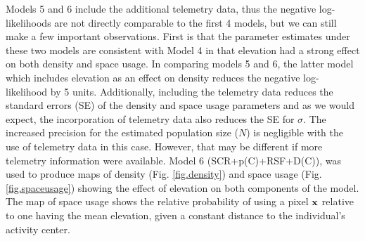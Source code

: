 Models 5 and 6 include the additional telemetry data, thus the negative log-likelihoods are
not directly comparable to the first 4 models, but we can still make a few 
important observations.  First is that the parameter estimates under these two 
models are consistent with Model 4 in that elevation had a strong effect on 
both density and space usage.  In comparing models 5 and 6, the latter model which includes
elevation as an effect on density reduces the negative log-likelihood by 5 units.
Additionally, including the telemetry data reduces the standard errors (SE) of 
the density and space usage parameters and as we would expect, the incorporation of
telemetry data also reduces the SE for $\sigma$.  The increased precision for the estimated
population size ($N$) is negligible with the use of telemetry data in this case.  However,
that may be different if more telemetry information were available.
Model 6 (SCR+p(C)+RSF+D(C)), was used to produce maps of
density (Fig. \ref{fig.density}) and space usage (Fig. \ref{fig.spaceusage}) showing
the effect of elevation on both components of the model.  The map of space
usage shows the relative probability of using a pixel ${\bf x}$ relative
to one having the mean elevation, given 
a constant distance to the individual's activity center.


